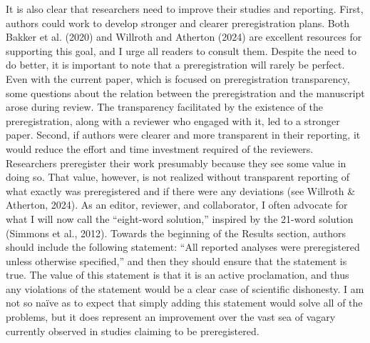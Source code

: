 \documentclass[authordate, empirical]{jote-new-article}
\begin{document}
	It is also clear that researchers need to improve their studies and reporting. First, authors could work to develop stronger and clearer preregistration plans. Both Bakker et al. (2020) and Willroth and Atherton (2024) are excellent resources for supporting this goal, and I urge all readers to consult them. Despite the need to do better, it is important to note that a preregistration will rarely be perfect. Even with the current paper, which is focused on preregistration transparency, some questions about the relation between the preregistration and the manuscript arose during review. The transparency facilitated by the existence of the preregistration, along with a reviewer who engaged with it, led to a stronger paper. Second, if authors were clearer and more transparent in their reporting, it would reduce the effort and time investment required of the reviewers. Researchers preregister their work presumably because they see some value in doing so. That value, however, is not realized without transparent reporting of what exactly was preregistered and if there were any deviations (see Willroth \& Atherton, 2024). As an editor, reviewer, and collaborator, I often advocate for what I will now call the “eight-word solution,” inspired by the 21-word solution (Simmons et al., 2012). Towards the beginning of the Results section, authors should include the following statement: “All reported analyses were preregistered unless otherwise specified,” and then they should ensure that the statement is true. The value of this statement is that it is an active proclamation, and thus any violations of the statement would be a clear case of scientific dishonesty. I am not so naïve as to expect that simply adding this statement would solve all of the problems, but it does represent an improvement over the vast sea of vagary currently observed in studies claiming to be preregistered.
\end{document}
